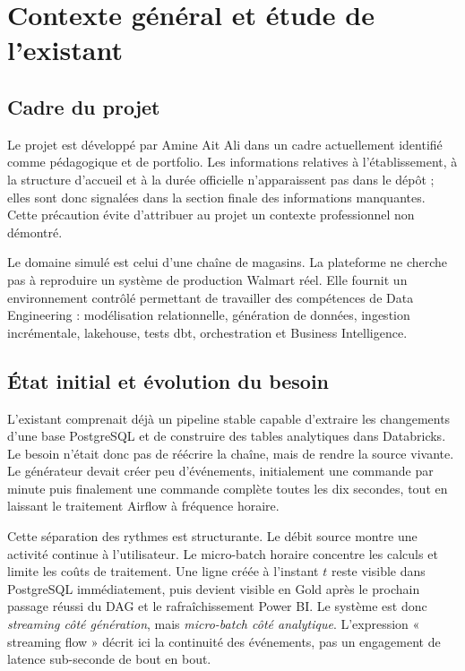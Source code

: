 \chapter{Contexte général et étude de l'existant}

\section{Cadre du projet}
Le projet est développé par Amine Ait Ali dans un cadre actuellement identifié comme pédagogique et de portfolio. Les informations relatives à l'établissement, à la structure d'accueil et à la durée officielle n'apparaissent pas dans le dépôt ; elles sont donc signalées dans la section finale des informations manquantes. Cette précaution évite d'attribuer au projet un contexte professionnel non démontré.

Le domaine simulé est celui d'une chaîne de magasins. La plateforme ne cherche pas à reproduire un système de production Walmart réel. Elle fournit un environnement contrôlé permettant de travailler des compétences de Data Engineering : modélisation relationnelle, génération de données, ingestion incrémentale, lakehouse, tests dbt, orchestration et Business Intelligence.

\section{État initial et évolution du besoin}
L'existant comprenait déjà un pipeline stable capable d'extraire les changements d'une base PostgreSQL et de construire des tables analytiques dans Databricks. Le besoin n'était donc pas de réécrire la chaîne, mais de rendre la source vivante. Le générateur devait créer peu d'événements, initialement une commande par minute puis finalement une commande complète toutes les dix secondes, tout en laissant le traitement Airflow à fréquence horaire.

Cette séparation des rythmes est structurante. Le débit source montre une activité continue à l'utilisateur. Le micro-batch horaire concentre les calculs et limite les coûts de traitement. Une ligne créée à l'instant \(t\) reste visible dans PostgreSQL immédiatement, puis devient visible en Gold après le prochain passage réussi du DAG et le rafraîchissement Power BI. Le système est donc \emph{streaming côté génération}, mais \emph{micro-batch côté analytique}. L'expression « streaming flow » décrit ici la continuité des événements, pas un engagement de latence sub-seconde de bout en bout.

